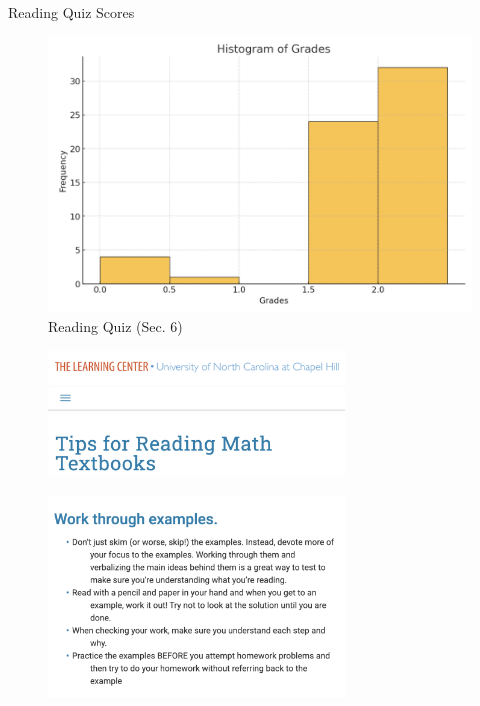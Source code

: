 \documentclass[10pt]{beamer}
\begin{document}
\begin{frame}{Reading Quiz Scores}

\begin{figure}[ht]
        \centering
        \includegraphics[width=\textwidth]{images/sec6_reading_scores}
        \caption{Reading Quiz (Sec. 6)}
        \label{fig:figure1}
\end{figure}
\end{frame}

\begin{frame}
\begin{figure}
\includegraphics[width=0.7\textwidth]{images/tips_for_reading_math}
\end{figure}
%
\begin{figure}
\includegraphics[width=0.7\textwidth]{images/work_through_examples}
\end{figure}
\end{frame}
\end{document}
